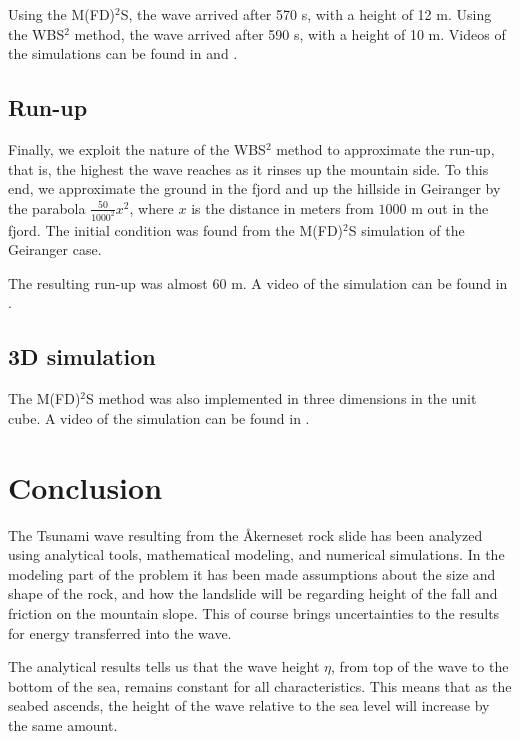 \documentclass[11pt]{article}
\begin{document}
Using the M(FD)$^2$S, the wave arrived after 570 s, with a height of 12 m. Using the WBS$^2$ method, the wave arrived after 590 s, with a height of 10 m.
Videos of the simulations can be found in \cite{geirangerMFDFD} and \cite{geriangerWBSS}.

\subsection{Run-up}
Finally, we exploit the nature of the WBS$^2$ method to approximate the run-up, that is, the highest the wave reaches as it rinses up the mountain side. To this end, we
approximate the ground in the fjord and up the hillside in Geiranger by the parabola $\frac{50}{1000^2}x^2$, where $x$ is the distance in meters from $1000$ m out in the fjord. The initial condition was found from the
M(FD)$^2$S simulation of the Geiranger case.

The resulting run-up was almost 60 m. A video of the simulation can be found in \cite{geirangerUnUpWBS}.
   
\subsection{3D simulation}
The M(FD)$^2$S method was also implemented in three dimensions in the unit cube. A video of the simulation
can be found in \cite{MFDFD3dExample}.
%
%
\section{Conclusion}

The Tsunami wave resulting from the Åkerneset rock slide has been analyzed using analytical tools, mathematical modeling, and numerical simulations. In the modeling part of the problem it has been made assumptions about the size and shape of the rock, and how the landslide will be regarding height of the fall and friction on the mountain slope. This of course brings uncertainties to the results for energy transferred into the wave. 

The analytical results tells us that the wave height $\eta$, from top of the wave to the bottom of the sea, remains constant for all characteristics. This means that as the seabed ascends, the height of the wave relative to the sea level will increase by the same amount.
\end{document}
